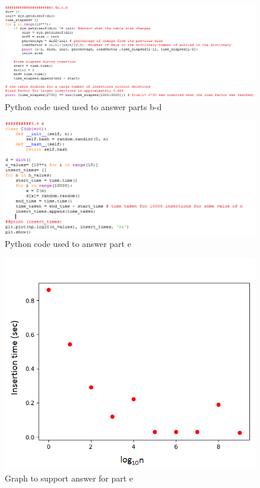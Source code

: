 \documentclass[12pt,twoside]{article}
\begin{document}
\begin{problems}
\begin{figure}[h]
	\centering 
	\includegraphics[width=\linewidth]{fig1.png}
	\caption{Python code used used to answer parts b-d}
	\label{fig:stuf}
\end{figure}

\clearpage

\begin{figure}
	\centering 
	\includegraphics[width=\linewidth]{fig3.png}
	\caption{Python code used to answer part e}
	\label{fig:stuf}
\end{figure}
\clearpage

\begin{figure}[h]
	\centering 
	\includegraphics[width=\linewidth]{figure2.png}
	\caption{Graph to support answer for part e}
	\label{fig:stuf}
\end{figure}


\end{problems}
\end{document}
